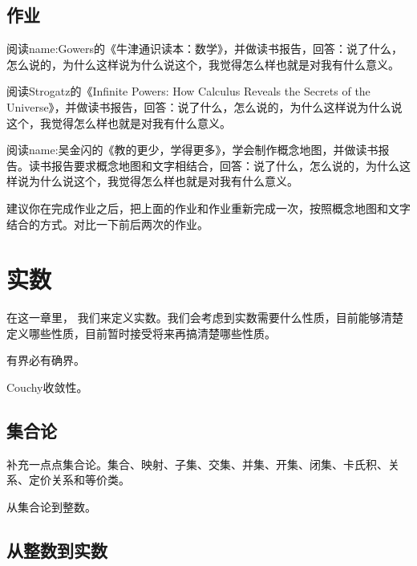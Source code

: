 \documentclass{ctexbook}
\newcommand{\ChapLabel}[1]{\label{#1}}
\newcommand{\HWLabel}[1]{\label{#1}}
\begin{document}
\section{作业}
\begin{Homework}			
阅读\gls{name:Gowers}的《牛津通识读本：数学》\cite{Gowers:Math}，并做读书报告，回答：说了什么，怎么说的，为什么这样说为什么说这个，我觉得怎么样也就是对我有什么意义。
\HWLabel{HW:Gowers}
\end{Homework}

\begin{Homework}			
阅读Strogatz的《Infinite Powers: How Calculus Reveals the Secrets of the Universe》\cite{Strogatz:InfinitePowers}，并做读书报告，回答：说了什么，怎么说的，为什么这样说为什么说这个，我觉得怎么样也就是对我有什么意义。
\HWLabel{HW:Strogatz}
\end{Homework}

\begin{Homework}			
阅读\gls{name:吴金闪}的《教的更少，学得更多》\cite{Wu:TLLM}，学会制作概念地图，并做读书报告。读书报告要求概念地图和文字相结合，回答：说了什么，怎么说的，为什么这样说为什么说这个，我觉得怎么样也就是对我有什么意义。
\HWLabel{HW:Wu}
\end{Homework}

\begin{Homework}			
建议你在完成作业\HWLabel{HW:Wu}之后，把上面的作业\HWLabel{HW:Gowers}和作业\HWLabel{HW:Strogatz}重新完成一次，按照概念地图和文字结合的方式。对比一下前后两次的作业。
\end{Homework}



\chapter{实数}
\ChapLabel{Chap:RealNumber}
在这一章里， 我们来定义实数。我们会考虑到实数需要什么性质，目前能够清楚定义哪些性质，目前暂时接受将来再搞清楚哪些性质。

有界必有确界。

Couchy收敛性。

\section{集合论}
补充一点点集合论。集合、映射、子集、交集、并集、开集、闭集、卡氏积、关系、定价关系和等价类。

从集合论到整数。

\section{从整数到实数}
\end{document}
